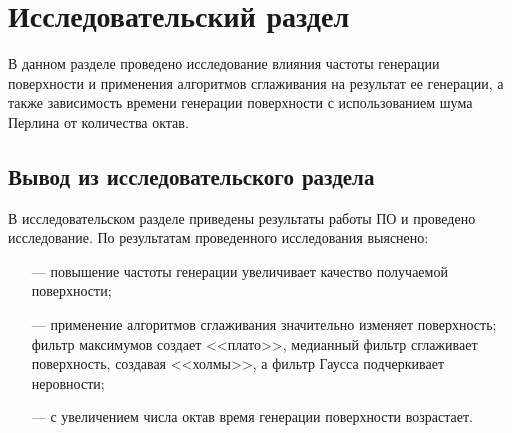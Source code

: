 \chapter{Исследовательский раздел}
В данном разделе проведено исследование влияния частоты генерации поверхности и применения алгоритмов сглаживания на результат ее генерации, а также зависимость времени генерации поверхности с использованием шума Перлина от количества октав.

\section{Вывод из исследовательского раздела}
В исследовательском разделе приведены результаты работы ПО и проведено исследование.
По результатам проведенного исследования выяснено:
\begin{itemize}
	\item[---]повышение частоты генерации увеличивает качество получаемой поверхности;
	\item[---]применение алгоритмов сглаживания значительно изменяет поверхность; фильтр максимумов создает <<плато>>, медианный фильтр сглаживает поверхность, создавая <<холмы>>, а фильтр Гаусса подчеркивает неровности;
	\item[---]с увеличением числа октав время генерации поверхности возрастает.
\end{itemize}
